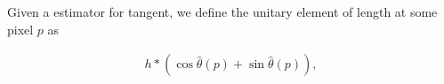 \documentclass[runningheads]{llncs}
\newtheorem{ddef}{Definition}
\DeclarePairedDelimiter\abs{\lvert}{\rvert}%
\begin{document}
 Given a estimator for tangent, we define the unitary element of length at some pixel $p$ as

\begin{align*}
	h*\left(\cos \hat{\theta}(p)  + \sin \hat{\theta}(p)\right),
\end{align*}


%
%
%
%
%
%
%
%
%
%
%
%
%
\end{document}
